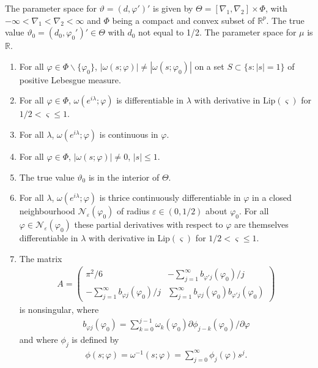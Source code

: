 {{\begin{assumption}\label{A3}
The parameter space for $\vartheta = (d,\varphi')'$ is given by $\Theta  = [\nabla_1,\nabla_2] \times \Phi$, with $-\infty < \nabla_1 < \nabla_2 < \infty$ and $\Phi$ being a compact and convex subset of $\mathbb{R}^p$. The true value $\vartheta_0 = (d_0,\varphi_0')' \in \Theta $ with $d_0$ not equal to 1/2. The parameter space for $\mu$ is $\mathbb{R}$.
\end{assumption}



\begin{assumption}\label{A1}
\begin{enumerate}[label=(\roman*)]
    \item For all $\varphi \in \Phi \backslash \{\varphi_0 \}$, $|\omega(s;\varphi)|\neq|\omega(s;\varphi_0)|$  on a set $S \subset \{ s : |s| = 1 \}$ of positive Lebesgue measure. \label{i}
    \item For all $\varphi \in \Phi$, $\omega(e^{i\lambda};\varphi)$ is differentiable in $\lambda$ with derivative in Lip$(\varsigma )$ for $1/2 < \varsigma  \leq 1$. 
    \item For all $\lambda$, $\omega(e^{i\lambda};\varphi)$ is continuous in $\varphi$.
    \item For all $\varphi \in \Phi $, $|\omega(s;\varphi)|\neq 0$, $|s| \leq 1$. 
    \item The true value $\vartheta_0$ is in the interior of $\Theta$.
    \item For all $\lambda$,  $\omega(e^{i\lambda};\varphi)$ is thrice continuously differentiable in $\varphi$ in a closed neighbourhood $\mathcal{N}_{\varepsilon}(\varphi_0)$ of radius $\varepsilon \in (0,1/2)$ about $\varphi_0$. For all $\varphi \in \mathcal{N}_{\varepsilon}(\varphi_0)$ these partial derivatives with respect to $\varphi$ are themselves differentiable in $\lambda$ with derivative in Lip$(\varsigma )$ for $1/2 < \varsigma  \leq 1$. 
    \item The matrix 
    \begin{align}
    A = \begin{pmatrix}
\pi^2/6 & - \sum_{j = 1}^{\infty} b_{\varphi' j}(\varphi_0)/j \\
- \sum_{j = 1}^{\infty} b_{\varphi j}(\varphi_0)/j  & \sum_{j = 1}^{\infty} b_{\varphi j}(\varphi_0) b_{\varphi' j}(\varphi_0)
\end{pmatrix}  \label{genA}
\end{align}
is nonsingular, where 
\begin{align}
  b_{\varphi j}(\varphi_0) = \sum_{k = 0}^{j-1} \omega_k(\varphi_0) \partial \phi_{j-k}(\varphi_0)/\partial \varphi  \label{bphii}
\end{align}
and where $\phi_{j}$ is defined by 
\begin{align}
 \phi(s;\varphi) = \omega^{-1}(s;\varphi) = \sum_{j = 0}^{\infty} \phi_j(\varphi) s^j.   \label{inverselag}
\end{align}
    \end{enumerate}
\end{assumption}


}}
